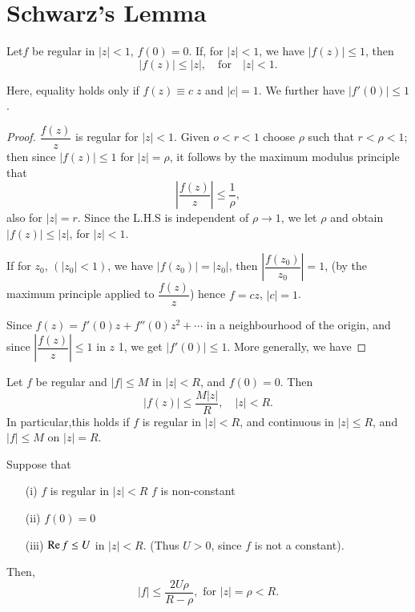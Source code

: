 \chapter{Schwarz's Lemma}\label{chap3}

\setcounter{thm}{0}
\begin{thm}\label{chap3:thm1}
Let\pageoriginale $f$ be regular in $|z| < 1$, $f(0) =0$.
If, for $|z|<1$, we have $|f(z)| \leq 1$, then
$$
|f(z)| \leq |z|, \quad \text{for} \quad |z|<1.
$$

Here, equality holds only if $f(z) \equiv c \; z$ and $|c| =1$. We
further have $|f'(0)| \leq 1$.
\end{thm}

\begin{proof}
$\dfrac{f(z)}{z}$ is regular for $|z|<1$. Given $o< r<1$ choose $\rho$
  such that $r < \rho <1$; then since $|f(z)| \leq 1$ for $|z| =
  \rho$, it follows by the maximum modulus principle that
$$
\left|\frac{f(z)}{z} \right| \leq \frac{1}{\rho},
$$
also for $|z| =r$. Since the L.H.S is independent of $\rho \to 1$, we let
$\rho$ and obtain $|f(z)| \leq |z|$, for $|z|<1$.

If for $z_0$,  $(|z_0| <1)$, we have $|f(z_0)| = |z_0|$, then $\left|
\dfrac{f(z_0)}{z_0}\right| =1$, \Big(by the maximum principle applied to
$\dfrac{f(z)}{z}$\Big) hence $f=cz$, $|c|=1$.

Since $f(z) = f'(0)z+f''(0)z^2 + \cdots$ in a neighbourhood of the
origin, and since $\left| \dfrac{f(z)}{z}\right| \leq 1$ in $z$ 1, we get
$|f' (0)| \leq 1$. More generally, we have
 \end{proof}

\medskip
{}
Let $f$ be regular and $|f| \leq M$ in $|z| < R$, and $f(0) =0$. Then 
$$
|f(z)| \leq \frac{M|z|}{R}, \quad |z|<R.
$$
In particular,\pageoriginale this holds if $f$ is regular in $|z|<R$,
and continuous in $|z|\leq R$, and $|f| \leq M$ on $|z|=R$.

\begin{thm}\label{chap3:thm2}
 \cite[p.112]{key12} Suppose that 
\begin{itemize}
\item[(i)] $f$ is regular in $|z|<R$ $f$ is non-constant

\item[(ii)] $f(0) = 0$

\item[(iii)] $\operatorname{Re} f \leq U$ in $|z| < R$. (Thus $U > 0$, since $f$ is
  not a constant).
\end{itemize}

Then,
$$
|f| \leq \frac{2U\rho}{R-\rho}, \text{ for } |z| = \rho < R.
$$
\end{thm}

